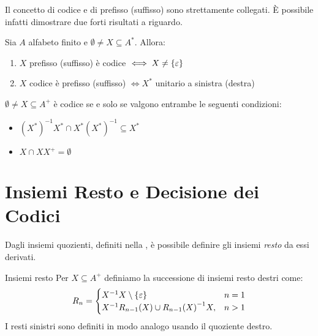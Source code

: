Il concetto di codice e di prefisso (suffisso) sono strettamente collegati.
È possibile infatti dimostrare due forti risultati a riguardo.
\begin{theorem}{}
  Sia \(A\) alfabeto finito e \(\emptyset \neq X \subseteq A^*\).
  Allora:
  \begin{enumerate}
    \item \(X\) prefisso (suffisso) è codice \(\iff X \neq \set{\varepsilon}\)
    \item \(X\) codice è prefisso (suffisso) \(\iff X^*\) unitario a sinistra (destra)
  \end{enumerate}
\end{theorem}

\begin{corollary}{}
  \(\emptyset \neq X \subseteq A^+\) è codice se e solo se valgono entrambe le seguenti condizioni:
  \begin{itemize}
    \item \({(X^*)}^{-1}X^* \cap X^*{(X^*)}^{-1} \subseteq X^* \)
    \item \(X \cap XX^+ = \emptyset\)
  \end{itemize}
\end{corollary}

\section{Insiemi Resto e Decisione dei Codici}

Dagli insiemi quozienti, definiti nella , è possibile definire gli insiemi \emph{resto} da essi derivati.
\begin{definition}{Insiemi resto}
  Per \(X \subseteq A^+\) definiamo la successione di insiemi resto destri come:
  \begin{equation}
    R_n=\begin{cases}
      X^{-1}X\setminus \set{\varepsilon} & n = 1\\
      X^{-1} R_{n-1}(X) \cup {R_{n-1}(X)}^{-1}X, & n > 1\\
    \end{cases}
  \end{equation}
  I resti sinistri sono definiti in modo analogo usando il quoziente destro.
\end{definition}

